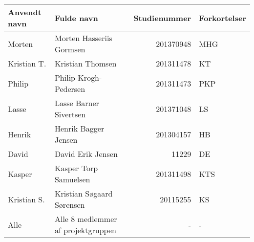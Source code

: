 \begin{table}[h]
	\centering
	\begin{tabularx}{\textwidth-0.5cm}{|l|X|r|l|}
	\hline
	\textbf{Anvendt navn} & \textbf{Fulde navn} & \textbf{Studienummer} & \textbf{Forkortelser}\\ \hline
	Morten & Morten Hasseriis Gormsen & 201370948 & MHG \\ \hline
	Kristian T. & Kristian Thomsen & 201311478 & KT \\ \hline
	Philip & Philip Krogh-Pedersen & 201311473 & PKP \\ \hline
	Lasse & Lasse Barner Sivertsen & 201371048 & LS \\ \hline
	Henrik & Henrik Bagger Jensen & 201304157  & HB\\ \hline
	David & David Erik Jensen & 11229          & DE\\ \hline
	Kasper & Kasper Torp Samuelsen & 201311498 & KTS\\ \hline
	Kristian S. & Kristian Søgaard Sørensen &  20115255 & KS \\ \hline
	Alle & Alle 8 medlemmer af projektgruppen & - & - \\ \hline
	\end{tabularx}
\end{table}

\clearpage